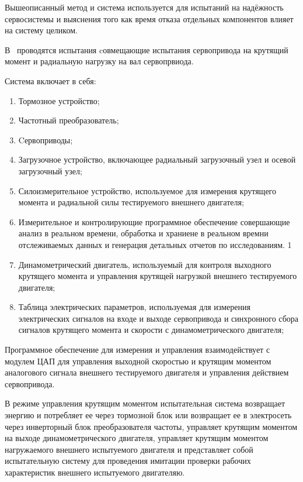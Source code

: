 Вышеописанный метод и система используется для испытаний на надёжность
сервосистемы и выяснения того как время отказа отдельных компонентов
влияет на систему целиком.

В~\cite{CN118549018A} проводятся испытания cовмещающие испытания
сервопривода на крутящий момент и радиальную нагрузку на вал
сервопрвиода.

Система включает в себя:
\begin{enumerate}
\item Тормозное устройство;
\item Частотный преобразователь;
  
\item Cервоприводы;
\item Загрузочное устройство, включающее радиальный загрузочный узел и
  осевой загрузочный узел;
\item Силоизмерительное устройство, используемое для измерения
  крутящего момента и радиальной силы тестируемого внешнего двигателя;
  
\item Измерительное и контролирующие программное обеспечение
  совершающие анализ в реальном времени, обработка и храниене в реальном
  времни отслеживаемых данных и генерация детальных отчетов по
  исследованиям.
  1
\item Динамометрический двигатель, используемый для контроля выходного
  крутящего момента и управления крутящей нагрузкой внешнего
  тестируемого двигателя;
  
\item Таблица электрических параметров, используемая для измерения
  электрических сигналов на входе и выходе сервопривода и синхронного
  сбора сигналов крутящего момента и скорости с динамометрического
  двигателя; 
\end{enumerate}

Программное обеспечение для измерения и управления взаимодействует с
модулем ЦАП для управления выходной скоростью и крутящим моментом
аналогового сигнала внешнего тестируемого двигателя и управления
действием сервопривода.

В режиме управления крутящим моментом испытательная система возвращает
энергию и потребляет ее через тормозной блок или возвращает ее в
электросеть через инверторный блок преобразователя частоты, управляет
крутящим моментом на выходе динамометрического двигателя, управляет
крутящим моментом нагружаемого внешнего испытуемого двигателя и
представляет собой испытательную систему для проведения имитации
проверки рабочих характеристик внешнего испытуемого двигателяю.

